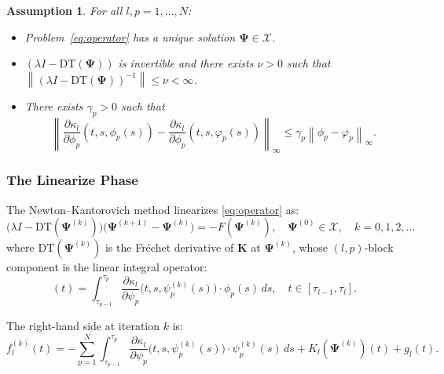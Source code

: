\documentclass[12pt, a4paper]{article}
\newtheorem{assumption}[theorem]{Assumption}
\newcommand{\norm}[1]{\left\| #1 \right\|}
\newcommand{\DT}{\mathrm{DT}}
\begin{document}
\begin{assumption}
\label{ass:main}
For all $l, p = 1, \ldots, N$:
\begin{itemize}
  \item[\emph{(i)}] Problem~\eqref{eq:operator} has a unique
    solution $\boldsymbol{\Psi} \in \mathcal{X}$.
  \item[\emph{(ii)}] $(\lambda I - \DT(\boldsymbol{\Psi}))$
    is invertible and there exists $\nu > 0$ such that
    $\norm{(\lambda I - \DT(\boldsymbol{\Psi}))^{-1}} \leq \nu < \infty$.
  \item[\emph{(iii)}] There exists $\gamma_p > 0$ such that
    \begin{equation*}
      \left\|
        \frac{\partial \kappa_l}{\partial \phi_p}(t, s, \phi_p(s))
        -
        \frac{\partial \kappa_l}{\partial \phi_p}(t, s, \varphi_p(s))
      \right\|_\infty
      \leq \gamma_p \norm{\phi_p - \varphi_p}_\infty.
    \end{equation*}
\end{itemize}
\end{assumption}

\subsubsection{The Linearize Phase}
\label{subsubsec:linearize}

The Newton--Kantorovich method linearizes
\eqref{eq:operator} as:
\begin{equation}
  \bigl(\lambda I - \DT(\boldsymbol{\Psi}^{(k)})\bigr)
  \bigl(\boldsymbol{\Psi}^{(k+1)} - \boldsymbol{\Psi}^{(k)}\bigr)
  = -F(\boldsymbol{\Psi}^{(k)}),
  \quad \boldsymbol{\Psi}^{(0)} \in \mathcal{X},
  \quad k = 0, 1, 2, \ldots
  \label{eq:newton}
\end{equation}
where $\DT(\boldsymbol{\Psi}^{(k)})$ is the Fr\'{e}chet
derivative of $\mathbf{K}$ at $\boldsymbol{\Psi}^{(k)}$,
whose $(l,p)$-block component is the linear integral operator:
\begin{equation}
  [T_{lp}(\boldsymbol{\Psi}^{(k)}) \phi_p](t) =
  \int_{\tau_{p-1}}^{\tau_p}
  \frac{\partial \kappa_l}{\partial \psi_p}
  \bigl(t, s, \psi_p^{(k)}(s)\bigr) \cdot \phi_p(s) \, ds,
  \quad t \in [\tau_{l-1}, \tau_l].
  \label{eq:Tlp}
\end{equation}

The right-hand side at iteration $k$ is:
\begin{equation}
  f_l^{(k)}(t) =
  - \sum_{p=1}^{N}
  \int_{\tau_{p-1}}^{\tau_p}
  \frac{\partial \kappa_l}{\partial \psi_p}
  \bigl(t, s, \psi_p^{(k)}(s)\bigr)
  \cdot \psi_p^{(k)}(s) \, ds
  + K_l(\boldsymbol{\Psi}^{(k)})(t) + g_l(t).
  \label{eq:rhs}
\end{equation}
\end{document}
